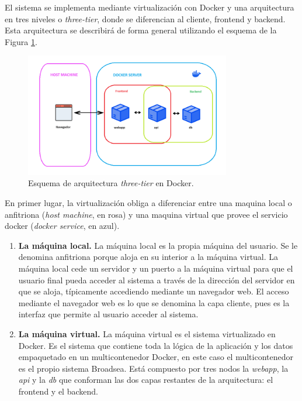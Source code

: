 {El sistema se implementa mediante virtualización con Docker y una arquitectura en tres niveles o \textit{three-tier}, donde se diferencian al cliente, frontend y backend. Esta arquitectura se describirá de forma general utilizando el esquema de la Figura \ref{fig:threeTierValle}.

\begin{figure}[H]
    \centering
    \includegraphics[width=0.80\textwidth]{figures/threeTierValle.png}
    \caption{Esquema de arquitectura \textit{three-tier} en Docker.}
    \label{fig:threeTierValle}
\end{figure}

En primer lugar, la virtualización obliga a diferenciar entre una maquina local o anfitriona (\textit{host machine}, en rosa) y una maquina virtual que provee el servicio docker (\textit{docker service}, en azul). 

\begin{enumerate}

    \item \textbf{La máquina local.} La máquina local es la propia máquina del usuario. Se le denomina anfitriona porque aloja en su interior a la máquina virtual. La máquina local cede un servidor y un puerto a la máquina virtual para que el usuario final pueda acceder al sistema a través de la dirección del servidor en que se aloja, típicamente accediendo mediante un navegador web. El acceso mediante el navegador web es lo que se denomina la capa cliente, pues es la interfaz que permite al usuario acceder al sistema. 

    \item \textbf{La máquina virtual.} La máquina virtual es el sistema virtualizado en Docker. Es el sistema que contiene toda la lógica de la aplicación y los datos empaquetado en un multicontenedor Docker, en este caso el multicontenedor es el propio sistema Broadsea. Está compuesto por tres nodos la \textit{webapp}, la \textit{api} y la \textit{db} que conforman las dos capas restantes de la arquitectura: el frontend y el backend.
    

\end{enumerate}}
